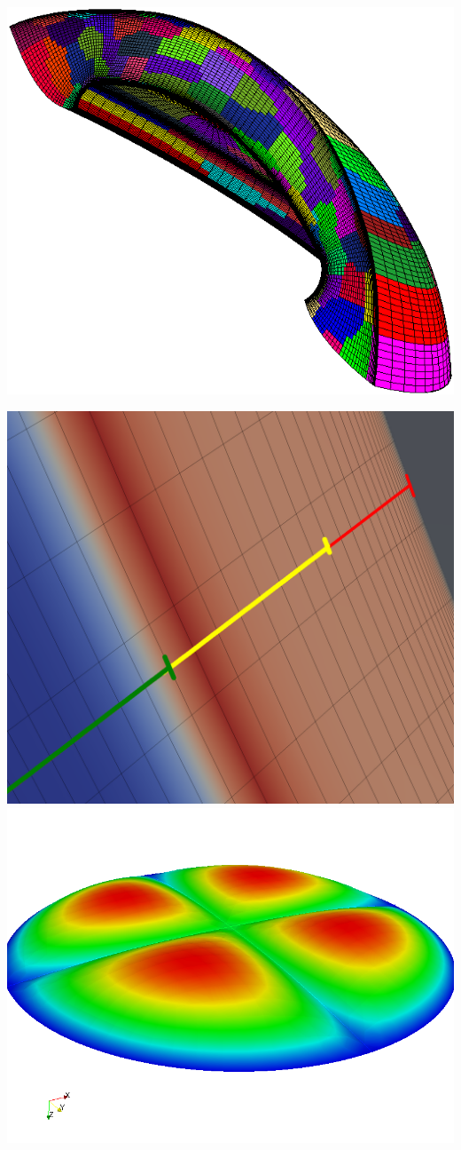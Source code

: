\documentclass[mathserif]{beamer}
\begin{document}
\begin{frame}[t]
\begin{columns}[t]
\begin{center}
	\includegraphics[width=.5\textwidth]{capsule_partitioned}

	\includegraphics[width=.45\textwidth]{fins-transition} \;
	\includegraphics[width=.45\textwidth]{sheet_perspective}

      \end{center}
  \end{columns}
\end{frame}
\end{document}
